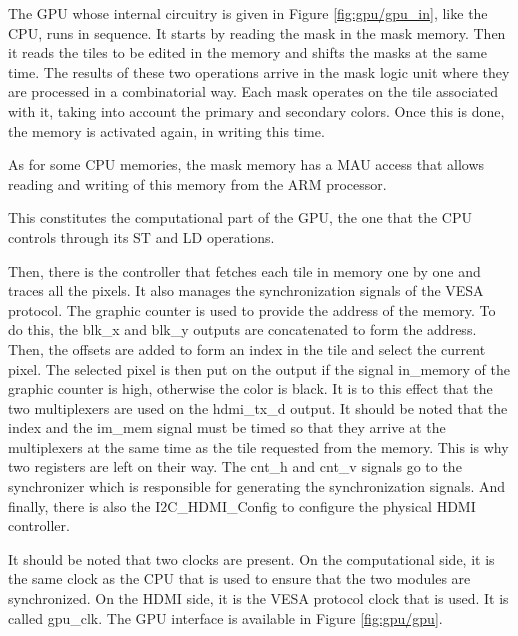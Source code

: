 The GPU whose internal circuitry is given in Figure \ref{fig:gpu/gpu_in}, like the CPU, runs in 
sequence. It starts by reading the mask in the mask memory. Then it reads the tiles to be edited in 
the memory and shifts the masks at the same time. The results of these two operations arrive in the 
mask logic unit where they are processed in a combinatorial way. Each mask operates on the tile 
associated with it, taking into account the primary and secondary colors. Once this is done, the 
memory is activated again, in writing this time. 

As for some CPU memories, the mask memory has a MAU access that allows reading and writing of this 
memory from the ARM processor.

This constitutes the computational part of the GPU, the one that the CPU controls through its ST and 
LD operations.

Then, there is the controller that fetches each tile in memory one by one and traces all the pixels. 
It also manages the synchronization signals of the VESA protocol. The graphic counter is used to 
provide the address of the memory. To do this, the blk\_x and blk\_y outputs are concatenated to 
form the address. Then, the offsets are added to form an index in the tile and select the current 
pixel. The selected pixel is then put on the output if the signal in\_memory of the graphic counter 
is high, otherwise the color is black. It is to this effect that the two multiplexers are used on 
the hdmi\_tx\_d output. It should be noted that the index and the im\_mem signal must be timed so 
that they arrive at the multiplexers at the same time as the tile requested from the memory. This 
is why two registers are left on their way. The cnt\_h and cnt\_v signals go to the synchronizer 
which is responsible for generating the synchronization signals. And finally, there is also the 
I2C\_HDMI\_Config to configure the physical HDMI controller.

It should be noted that two clocks are present. On the computational side, it is the same clock as 
the CPU that is used to ensure that the two modules are synchronized. On the HDMI side, it is the 
VESA protocol clock that is used. It is called gpu\_clk. The GPU interface is available in Figure
\ref{fig:gpu/gpu}.

